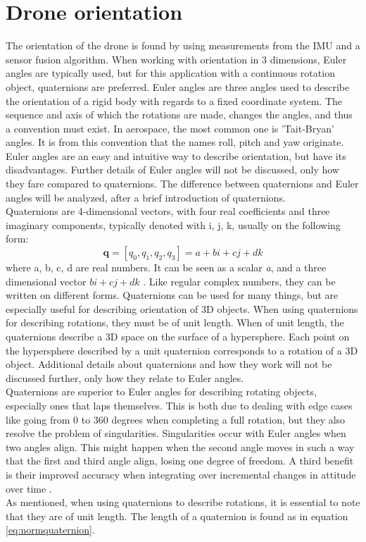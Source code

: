 \section{Drone orientation}
The orientation of the drone is found by using measurements from the IMU and a sensor fusion algorithm. When working with orientation in 3 dimensions, Euler angles are typically used, but for this application with a continuous rotation object, quaternions are preferred. Euler angles are three angles used to describe the orientation of a rigid body with regards to a fixed coordinate system. The sequence and axis of which the rotations are made, changes the angles, and thus a convention must exist. In aerospace, the most common one is 'Tait-Bryan' angles. It is from this convention that the names roll, pitch and yaw originate. Euler angles are an easy and intuitive way to describe orientation, but have its disadvantages. Further details of Euler angles will not be discussed, only how they fare compared to quaternions. The difference between quaternions and Euler angles will be analyzed, after a brief introduction of quaternions.\\ 


Quaternions are 4-dimensional vectors, with four real coefficients and three imaginary components, typically denoted with i, j, k, usually on the following form:
\begin{equation*}
    \textbf{q} = [q_0, q_1, q_2, q_3] = a + bi + cj + dk
\end{equation*}
where a, b, c, d are real numbers. It can be seen as a scalar \textit{a}, and a three dimensional vector $bi + cj + dk$ . Like regular complex numbers, they can be written on different forms. Quaternions can be used for many things, but are especially useful for describing orientation of 3D objects. When using quaternions for describing rotations, they must be of unit length. When of unit length, the quaternions describe a 3D space on the surface of a hypersphere. Each point on the hypersphere described by a unit quaternion corresponds to a rotation of a 3D object. 
Additional details about quaternions and how they work will not be discussed further, only how they relate to Euler angles.\\

Quaternions are superior to Euler angles for describing rotating objects, especially ones that laps themselves. This is both due to dealing with edge cases like going from 0 to 360 degrees when completing a full rotation, but they also resolve the problem of singularities. Singularities occur with Euler angles when two angles align. This might happen when the second angle moves in such a way that the first and third angle align, losing one degree of freedom. A third benefit is their improved accuracy when integrating over incremental changes in attitude over time \cite{JamesDiebelQuaternions}. \\
As mentioned, when using quaternions to describe rotations, it is essential to note that they are of unit length. The length of a quaternion is found as in equation \ref{eq:normquaternion}. 


